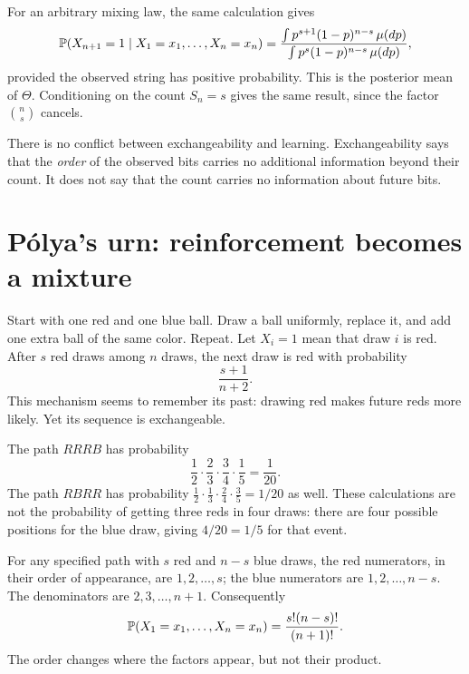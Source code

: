 For an arbitrary mixing law, the same calculation gives
\begin{equation}\label{eq:df-predict}
\P(X_{n+1}=1\mid X_1=x_1,\ldots,X_n=x_n)
=\frac{\int p^{s+1}(1-p)^{n-s}\,\mu(dp)}
{\int p^s(1-p)^{n-s}\,\mu(dp)},
\end{equation}
provided the observed string has positive probability. This is the posterior mean of $\Theta$. Conditioning on the count $S_n=s$ gives the same result, since the factor $\binom ns$ cancels.

There is no conflict between exchangeability and learning. Exchangeability says that the \emph{order} of the observed bits carries no additional information beyond their count. It does not say that the count carries no information about future bits.

\section{P\'olya's urn: reinforcement becomes a mixture}
\label{sec:polya}

Start with one red and one blue ball. Draw a ball uniformly, replace it, and add one extra ball of the same color. Repeat. Let $X_i=1$ mean that draw $i$ is red. After $s$ red draws among $n$ draws, the next draw is red with probability
\begin{equation}\label{eq:polya-predict}
\frac{s+1}{n+2}.
\end{equation}
This mechanism seems to remember its past: drawing red makes future reds more likely. Yet its sequence is exchangeable.

\begin{example}
The path $RRRB$ has probability
\[
\frac12\cdot\frac23\cdot\frac34\cdot\frac15=\frac1{20}.
\]
The path $RBRR$ has probability $\tfrac12\cdot\tfrac13\cdot\tfrac24\cdot\tfrac35=1/20$ as well. These calculations are not the probability of getting three reds in four draws: there are four possible positions for the blue draw, giving $4/20=1/5$ for that event.
\end{example}

For any specified path with $s$ red and $n-s$ blue draws, the red numerators, in their order of appearance, are $1,2,\ldots,s$; the blue numerators are $1,2,\ldots,n-s$. The denominators are $2,3,\ldots,n+1$. Consequently
\begin{equation}\label{eq:polya-word}
\P(X_1=x_1,\ldots,X_n=x_n)=\frac{s!(n-s)!}{(n+1)!}.
\end{equation}
The order changes where the factors appear, but not their product.

